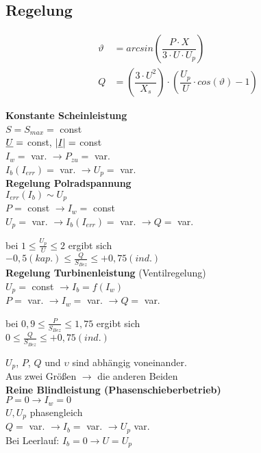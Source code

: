 \subsection{Regelung}
\begin{align*}
    \vartheta &= arcsin\left( \dfrac{P \cdot X}{3 \cdot U \cdot U_{p}}\right)\\
    Q &= \left( \dfrac{3 \cdot U^2}{X_s}\right) \cdot \left( \dfrac{U_p}{U} \cdot cos( \vartheta)-1\right)
\end{align*}

\textbf{Konstante Scheinleistung}\\
\indent $S = S_{max} =$ const\\
\indent $\underline{U}=$ const, $|\underline{I}| =$ const\\
\indent $I_w =$ var. $\rightarrow P_{zu}=$ var.\\
\indent $I_b(I_{err}) =$ var. $\rightarrow U_p =$ var.\\

\textbf{Regelung Polradspannung}\\
\indent $I_{err}(I_b) \sim U_p$ \\
\indent $P =$ const $\rightarrow I_w= $ const\\
\indent $U_p =$ var. $\rightarrow I_b(I_{err}) = $ var. $\rightarrow Q=$ var.

\indent bei $1 \leq \frac{U_p}{U} \leq 2$ ergibt sich \\
\indent $-0,5 (kap.) \leq \frac{Q}{S_{Bez}} \leq +0,75(ind.)$\\

\textbf{Regelung Turbinenleistung} (Ventilregelung)\\
\indent $U_p =$ const $\rightarrow I_b = f(I_w)$\\
\indent $P =$ var. $\rightarrow I_w= $ var. $\rightarrow Q =$ var.

\indent bei $0,9 \leq \frac{P}{S_{Bez}} \leq 1,75$ ergibt sich\\
\indent $0 \leq \frac{Q}{S_{Bez}} \leq +0,75(ind.)$

$U_p$, $ P$, $Q$ und $\upsilon$ sind abhängig voneinander. \\
Aus zwei Größen $\rightarrow$ die anderen Beiden\\

\textbf{Reine Blindleistung (Phasenschieberbetrieb)}\\
\indent $P = 0 \rightarrow I_w= 0$ \\
$U, U_p$ phasengleich\\
\indent $Q =$ var. $\rightarrow I_b = $ var. $\rightarrow U_p$ var.\\
Bei Leerlauf: $I_b = 0 \rightarrow U = U_p$
